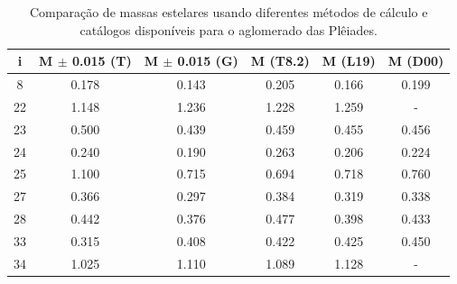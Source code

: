 \begin{table}[htbp]
\centering
\caption[Resultados de massas estelares para as Plêiades]{Comparação de massas estelares usando diferentes métodos de cálculo e catálogos disponíveis para o aglomerado das Plêiades.}
\label{tab:ple_massas}
\begin{tabular}{cccccc}
\hline
{i} & {M $\pm$ 0.015 (T)} & {M $\pm$ 0.015 (G)} & {M (T8.2)} & {M (L19)} & {M (D00)} \\ \hline
        8   & 0.178 & 0.143 & 0.205 & 0.166 & 0.199 \\
		22  & 1.148 & 1.236 & 1.228 & 1.259 & - \\
		23  & 0.500 & 0.439 & 0.459 & 0.455 & 0.456 \\
		24  & 0.240 & 0.190 & 0.263 & 0.206 & 0.224 \\
		25  & 1.100 & 0.715 & 0.694 & 0.718 & 0.760 \\
		27  & 0.366 & 0.297 & 0.384 & 0.319 & 0.338 \\
		28  & 0.442 & 0.376 & 0.477 & 0.398 & 0.433 \\
		33  & 0.315 & 0.408 & 0.422 & 0.425 & 0.450 \\
		34  & 1.025 & 1.110 & 1.089 & 1.128 & - \\
\hline
\end{tabular}
\end{table}
